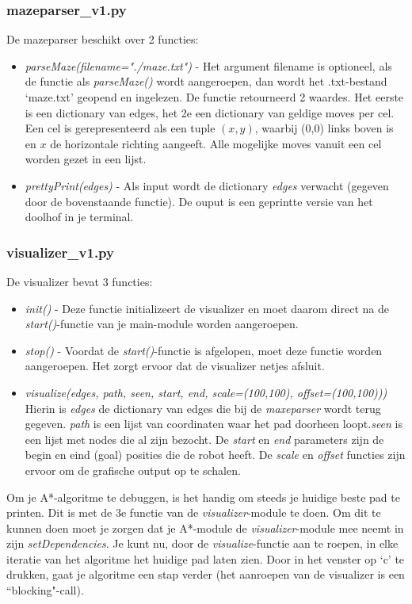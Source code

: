 \documentclass[a4paper]{article}
\begin{document}
\subsubsection{mazeparser\_v1.py}
De mazeparser beschikt over 2 functies:
\begin{itemize}
\item \textit{parseMaze(filename="./maze.txt")} - Het argument filename is optioneel, als de functie als \textit{parseMaze()} wordt aangeroepen, dan wordt het .txt-bestand `maze.txt' geopend en ingelezen. De functie retourneerd 2 waardes. Het eerste is een dictionary van edges, het 2e een dictionary van geldige moves per cel. Een cel is gerepresenteerd als een tuple $(x,y)$, waarbij (0,0) links boven is en $x$ de horizontale richting aangeeft. Alle mogelijke moves vanuit een cel worden gezet in een lijst.
\item \textit{prettyPrint(edges)} - Als input wordt de dictionary \textit{edges} verwacht (gegeven door de bovenstaande functie). De ouput is een geprintte versie van het doolhof in je terminal.
\end{itemize}

\subsubsection{visualizer\_v1.py}
De visualizer bevat 3 functies: \\
\begin{itemize}
\item \textit{init()} - Deze functie initializeert de visualizer en moet daarom direct na de \textit{start()}-functie van je main-module worden aangeroepen.
\item \textit{stop()} - Voordat de \textit{start()}-functie is afgelopen, moet deze functie worden aangeroepen. Het zorgt ervoor dat de visualizer netjes afsluit.
\item \textit{visualize(edges, path, seen, start, end, scale=(100,100), offset=(100,100)))}\\ Hierin is \textit{edges} de dictionary van edges die bij de \textit{maxeparser} wordt terug gegeven. \textit{path} is een lijst van coordinaten waar het pad doorheen loopt.\textit{seen} is een lijst met nodes die al zijn bezocht. De \textit{start} en \textit{end} parameters zijn de begin en eind (goal) posities die de robot heeft. De \textit{scale} en \textit{offset} functies zijn ervoor om de grafische output op te schalen.
\end{itemize}

Om je A*-algoritme te debuggen, is het handig om steeds je huidige beste pad te printen. Dit is met de 3e functie van de \textit{visualizer}-module te doen. Om dit te kunnen doen moet je zorgen dat je A*-module de \textit{visualizer}-module mee neemt in zijn \textit{setDependencies}. Je kunt nu, door de \textit{visualize}-functie aan te roepen, in elke iteratie van het algoritme het huidige pad laten zien. Door in het venster  op `c' te drukken, gaat je algoritme een stap verder (het aanroepen van de visualizer is een ``blocking"-call).
\end{document}
